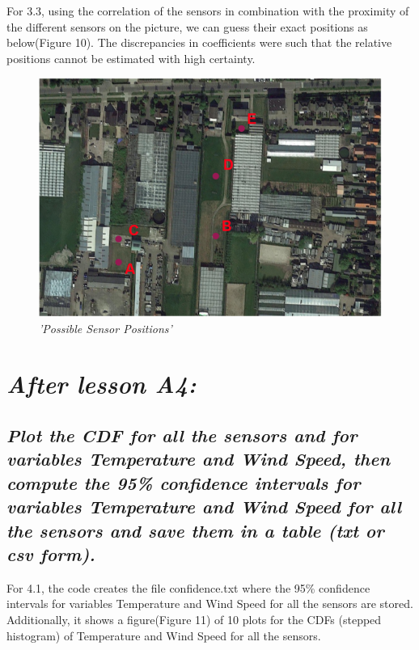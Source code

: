 \documentclass[a4paper,12pt]{article} %
\begin{document}
For 3.3, using the correlation of the sensors in combination with the proximity of the different sensors on the picture, we can guess their exact positions as below(Figure 10). 
The discrepancies in coefficients were such that the relative positions cannot 
be estimated with high certainty.



\begin{figure}[H]
\centering
\includegraphics[width=\textwidth]{Graphs/SensorsSketch.png}
\caption{\it'Possible Sensor Positions'}
\end{figure}




\section{\it After lesson A4:}
\subsection{\it Plot the CDF for all the sensors and for variables Temperature and Wind Speed, then compute the 95\% confidence intervals for variables Temperature and Wind Speed for all the sensors and save them in a table (txt or csv form).}




For 4.1, the code creates the file confidence.txt where the 95\% 
confidence intervals for variables Temperature and Wind Speed 
for all the sensors are stored. Additionally, it shows a 
figure(Figure 11) of 10 plots for the CDFs (stepped histogram) of Temperature and Wind Speed for all the sensors.
\end{document}
